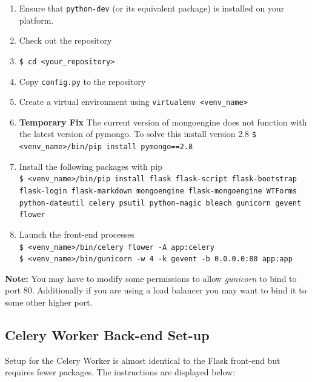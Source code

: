 \documentclass[11pt]{report}
\begin{document}
\begin{enumerate}
\item Ensure that \verb|python-dev| (or its equivalent package) is installed on your platform.
\item Check out the repository
\item \verb|$ cd <your_repository>|
\item Copy \texttt{config.py} to the repository
\item Create a virtual environment using \verb|virtualenv <venv_name>|
\item \textbf{Temporary Fix} The current version of mongoengine does not function with the latest version
of pymongo. To solve this install version 2.8 \verb|$ <venv_name>/bin/pip install pymongo==2.8|
\item Install the following packages with pip\\
\texttt{\$ <venv\_name>/bin/pip install flask flask-script flask-bootstrap flask-login flask-markdown mongoengine flask-mongoengine WTForms python-dateutil celery psutil python-magic bleach gunicorn gevent flower}
\item Launch the front-end processes\\
\verb|$ <venv_name>/bin/celery flower -A app:celery|\\
\verb|$ <venv_name>/bin/gunicorn -w 4 -k gevent -b 0.0.0.0:80 app:app|
\end{enumerate}

\noindent\textbf{Note:} You may have to modify some permissions to allow \emph{gunicorn} to bind to port 80. 
Additionally if you are using a load balancer you may want to bind it to some other higher port.

\subsection{Celery Worker Back-end Set-up}
Setup for the Celery Worker is almost identical to the Flask front-end but requires fewer packages. The
instructions are displayed below:
\end{document}
